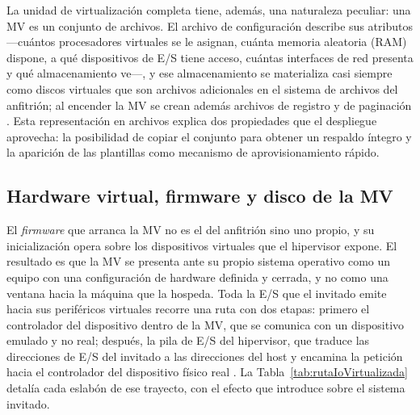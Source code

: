 \documentclass[12pt]{article}
\begin{document}
La unidad de virtualización completa tiene, además, una naturaleza peculiar: una MV es un conjunto de archivos. El archivo de configuración describe sus atributos ---cuántos procesadores virtuales se le asignan, cuánta memoria aleatoria (RAM) dispone, a qué dispositivos de E/S tiene acceso, cuántas interfaces de red presenta y qué almacenamiento ve---, y ese almacenamiento se materializa casi siempre como discos virtuales que son archivos adicionales en el sistema de archivos del anfitrión; al encender la MV se crean además archivos de registro y de paginación \parencite[\S 14.2, p.\ 632]{stallings2018operating}. Esta representación en archivos explica dos propiedades que el despliegue aprovecha: la posibilidad de copiar el conjunto para obtener un respaldo íntegro y la aparición de las plantillas como mecanismo de aprovisionamiento rápido.

\subsection{Hardware virtual, firmware y disco de la MV}
\label{sec:hardwareVirtual}

El \textit{firmware} que arranca la MV no es el del anfitrión sino uno propio, y su inicialización opera sobre los dispositivos virtuales que el hipervisor expone. El resultado es que la MV se presenta ante su propio sistema operativo como un equipo con una configuración de hardware definida y cerrada, y no como una ventana hacia la máquina que la hospeda. Toda la E/S que el invitado emite hacia sus periféricos virtuales recorre una ruta con dos etapas: primero el controlador del dispositivo dentro de la MV, que se comunica con un dispositivo emulado y no real; después, la pila de E/S del hipervisor, que traduce las direcciones de E/S del invitado a las direcciones del host y encamina la petición hacia el controlador del dispositivo físico real \parencite[\S 14.6, p.\ 646]{stallings2018operating}. La Tabla~\ref{tab:rutaIoVirtualizada} detalía cada eslabón de ese trayecto, con el efecto que introduce sobre el sistema invitado.
\end{document}
